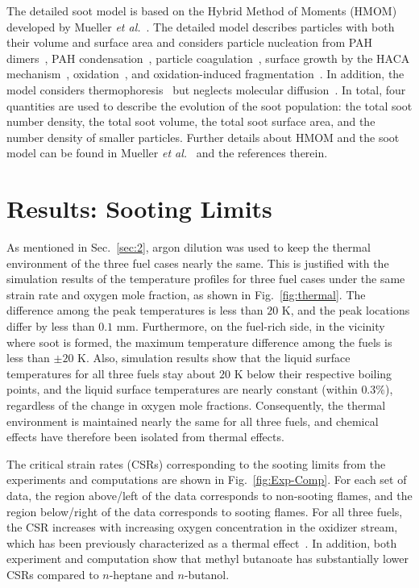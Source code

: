 \documentclass[review,3p,times]{elsarticleUS}
\begin{document}
The detailed soot model is based on the Hybrid Method of Moments (HMOM) developed by Mueller \emph{et al.}~\cite{mueller09a,mueller09b,mueller11a}. The detailed model describes particles with both their volume and surface area and considers particle nucleation from PAH dimers~\cite{schuetz02,wong09,blanquart09c}, PAH condensation~\cite{park03,mitchell98,mitchell03}, particle coagulation~\cite{mueller09b}, surface growth by the HACA mechanism~\cite{frenklach91}, oxidation~\cite{kazakov95,neoh81}, and oxidation-induced fragmentation~\cite{mueller11a}. In addition, the model considers thermophoresis~\cite{waldmann66} but neglects molecular diffusion~\cite{bisetti12}. In total, four quantities are used to describe the evolution of the soot population: the total soot number density, the total soot volume, the total soot surface area, and the number density of smaller particles.  Further details about HMOM and the soot model can be found in Mueller \emph{et al.}~\cite{mueller09a,mueller09b,mueller11a} and the references therein.

\section{Results: Sooting Limits}
\label{sec:4}

As mentioned in Sec.~\ref{sec:2}, argon dilution was used to keep the thermal environment of the three fuel cases nearly the same.  This is justified with the simulation results of the temperature profiles for three fuel cases under the same strain rate and oxygen mole fraction, as shown in Fig.~\ref{fig:thermal}.  The difference among the peak temperatures is less than $20$ K, and the peak locations differ by less than $0.1$ mm.  Furthermore, on the fuel-rich side, in the vicinity where soot is formed, the maximum temperature difference among the fuels is less than $\pm20$ K.  Also, simulation results show that the liquid surface temperatures for all three fuels stay about $20$ K below their respective boiling points, and the liquid surface temperatures are nearly constant (within $0.3\%$), regardless of the change in oxygen mole fractions.  Consequently, the thermal environment is maintained nearly the same for all three fuels, and chemical effects have therefore been isolated from thermal effects. 


The critical strain rates (CSRs) corresponding to the sooting limits from the experiments and computations are shown in Fig.~\ref{fig:Exp-Comp}. For each set of data, the region above/left of the data corresponds to non-sooting flames, and the region below/right of the data corresponds to sooting flames. For all three fuels, the CSR increases with increasing oxygen concentration in the oxidizer stream, which has been previously characterized as a thermal effect~\cite{du91}. In addition, both experiment and computation show that methyl butanoate has substantially lower CSRs compared to  $n$-heptane and $n$-butanol. 
\end{document}
